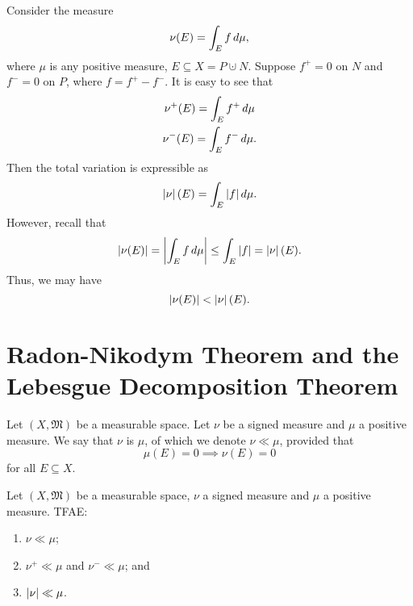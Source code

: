 \documentclass[notoc,notitlepage]{tufte-book}
\begin{document}
\begin{warning}
  Consider the measure
  \begin{equation*}
    \nu(E) = \int_{E} f \mathop{}\!d{\mu},
  \end{equation*}
  where $\mu$ is any positive measure, $E \subseteq X = P \cupdot N$.
  Suppose $f^+ = 0$ on $N$ and $f^- = 0$ on $P$, where $f = f^+ - f^-$.
  It is easy to see that
  \begin{gather*}
    \nu^+(E) = \int_{E} f^+ \mathop{}\!d{\mu} \\
    \nu^-(E) = \int_{E} f^- \mathop{}\!d{\mu}.
  \end{gather*}
  Then the total variation is expressible as
  \begin{equation*}
    \left|\nu\right|(E) = \int_{E} \left|f\right| \mathop{}\!d{\mu}.
  \end{equation*}
  However, recall that
  \begin{equation*}
    \left|\nu(E)\right| = \left|\int_{E} f \mathop{}\!d{\mu}\right|
                 \leq \int_{E} \left|f\right| = \left|\nu\right|(E).
  \end{equation*}
  Thus, we may have
  \begin{equation*}
    \left|\nu(E)\right| < \left|\nu\right|(E).
  \end{equation*}
\end{warning}


\section{Radon-Nikodym Theorem and the Lebesgue Decomposition Theorem}%
\label{sec:radon_nikodym_theorem_and_the_lebesgue_decomposition_theorem}

\begin{defn}\label{defn:absolutely_continuous_measure}
  Let $(X, \mathfrak{M})$ be a measurable space.
  Let $\nu$ be a signed measure and $\mu$ a positive measure.
  We say that $\nu$ is  $\mu$,
  of which we denote $\nu \ll \mu$, provided that
  \begin{equation*}
    \mu(E) = 0 \implies \nu(E) = 0
  \end{equation*}
  for all $E \subseteq X$.
\end{defn}

\begin{lemma}\label{lemma:equivalent_definitions_of_a_absolutely_continuous_measure}
  Let $(X, \mathfrak{M})$ be a measurable space,
  $\nu$ a signed measure and $\mu$ a positive measure. TFAE:
  \begin{enumerate}
    \item $\nu \ll \mu$;
    \item $\nu^+ \ll \mu$ and $\nu^- \ll \mu$; and
    \item $\left|\nu\right| \ll \mu$.
  \end{enumerate}
\end{lemma}
\end{document}
